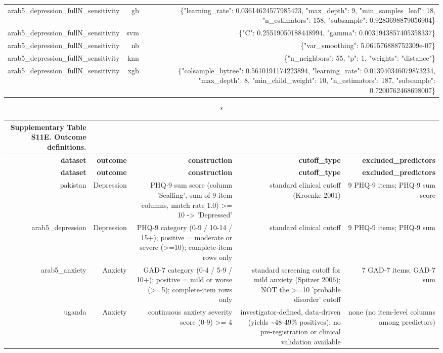 \documentclass[10pt]{article}
\begin{document}
\begin{longtable}{rrr}
arab5\_depression\_fullN\_sensitivity & gb & \{"learning\_rate": 0.03614624577985423, "max\_depth": 9, "min\_samples\_leaf": 18, "n\_estimators": 158, "subsample": 0.9283698879056904\} \\
arab5\_depression\_fullN\_sensitivity & svm & \{"C": 0.25519050188448994, "gamma": 0.0031943857405358337\} \\
arab5\_depression\_fullN\_sensitivity & nb & \{"var\_smoothing": 5.061576888752309e-07\} \\
arab5\_depression\_fullN\_sensitivity & knn & \{"n\_neighbors": 55, "p": 1, "weights": "distance"\} \\
arab5\_depression\_fullN\_sensitivity & xgb & \{"colsample\_bytree": 0.5610191174223894, "learning\_rate": 0.013940346079873234, "max\_depth": 8, "min\_child\_weight": 10, "n\_estimators": 187, "subsample": 0.7200762468698007\} \\
\bottomrule
\end{longtable}
\normalsize

\tiny
\setlength{\tabcolsep}{2pt}
\begin{longtable}{rrrrr}
\caption*{\textbf{Supplementary Table S11E.} Outcome definitions.}\\
\toprule
\textbf{dataset} & \textbf{outcome} & \textbf{construction} & \textbf{cutoff\_type} & \textbf{excluded\_predictors} \\
\midrule
\endfirsthead
\toprule
\textbf{dataset} & \textbf{outcome} & \textbf{construction} & \textbf{cutoff\_type} & \textbf{excluded\_predictors} \\
\midrule
\endhead
\bottomrule
\endfoot
pakistan & Depression & PHQ-9 sum score (column 'Scalling', sum of 9 item columns, match rate 1.0) >= 10 -> 'Depressed' & standard clinical cutoff (Kroenke 2001) & 9 PHQ-9 items; PHQ-9 sum score \\
arab5\_depression & Depression & PHQ-9 category (0-9 / 10-14 / 15+); positive = moderate or severe (>=10); complete-item rows only & standard clinical cutoff & 9 PHQ-9 items; PHQ-9 sum \\
arab5\_anxiety & Anxiety & GAD-7 category (0-4 / 5-9 / 10+); positive = mild or worse (>=5); complete-item rows only & standard screening cutoff for mild anxiety (Spitzer 2006); NOT the >=10 'probable disorder' cutoff & 7 GAD-7 items; GAD-7 sum \\
uganda & Anxiety & continuous anxiety severity score (0-9) >= 4 & investigator-defined, data-driven (yields \textasciitilde{}48-49\% positives); no pre-registration or clinical validation available & none (no item-level columns among predictors) \\
\bottomrule
\end{longtable}
\normalsize
\end{document}
